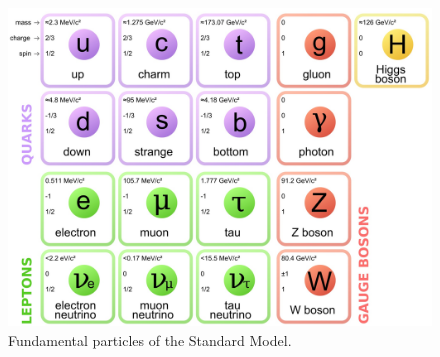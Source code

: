 \begin{figure}
\centering
\includegraphics[width=0.6\linewidth]{plots/Intro/sm.jpg}
\caption{Fundamental particles of the Standard Model\cite{SM_table}.} \label{fig:intro:sm}
\end{figure}